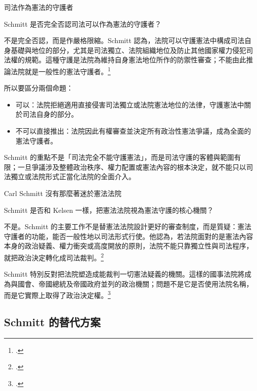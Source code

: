 \begin{qaprompt}
司法作為憲法的守護者
\end{qaprompt}

\begin{qaquestion}
Schmitt 是否完全否認司法可以作為憲法的守護者？
\end{qaquestion}

不是完全否認，而是作嚴格限縮。Schmitt 認為，法院可以守護憲法中構成司法自身基礎與地位的部分，尤其是司法獨立、法院組織地位及防止其他國家權力侵犯司法權的規範。這種守護是法院為維持自身憲法地位所作的防禦性審查；不能由此推論法院就是一般性的憲法守護者。\footcites[85]{schmitt2015}[17]{schmitt1931}

所以要區分兩個命題：

\begin{itemize}
\tightlist
\item
  可以：法院拒絕適用直接侵害司法獨立或法院憲法地位的法律，守護憲法中關於司法自身的部分。
\item
  不可以直接推出：法院因此有權審查並決定所有政治性憲法爭議，成為全面的憲法守護者。
\end{itemize}

Schmitt 的重點不是「司法完全不能守護憲法」，而是司法守護的客體與範圍有限；一旦爭議涉及整體政治秩序、權力配置或憲法內容的根本決定，就不能只以司法獨立或法院形式正當化法院的全面介入。


\begin{qaprompt}
Carl Schmitt 沒有那麼著迷於憲法法院
\end{qaprompt}

\begin{qaquestion}
Schmitt 是否和 Kelsen 一樣，把憲法法院視為憲法守護的核心機關？
\end{qaquestion}

不是。Schmitt 的主要工作不是替憲法法院設計更好的審查制度，而是質疑：憲法守護者的功能，能否一般性地以司法形式行使。他認為，若法院面對的是憲法內容本身的政治疑義、權力衝突或高度開放的原則，法院不能只靠獨立性與司法程序，就把政治決定轉化成司法裁判。\footcites[95, 100--103]{schmitt2015}[26, 31--33]{schmitt1931}

Schmitt 特別反對把法院塑造成能裁判一切憲法疑義的機關。這樣的國事法院將成為與國會、帝國總統及帝國政府並列的政治機關；問題不是它是否使用法院名稱，而是它實際上取得了政治決定權。\footcites[100--101]{schmitt2015}[31]{schmitt1931}

\subsection{Schmitt 的替代方案}

